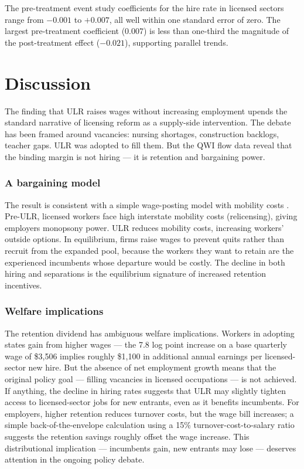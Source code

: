 \documentclass[12pt]{article}
\begin{document}
The pre-treatment event study coefficients for the hire rate in licensed sectors range from $-0.001$ to $+0.007$, all well within one standard error of zero. The largest pre-treatment coefficient (0.007) is less than one-third the magnitude of the post-treatment effect ($-0.021$), supporting parallel trends.


\section{Discussion}
\label{sec:discussion}

The finding that ULR raises wages without increasing employment upends the standard narrative of licensing reform as a supply-side intervention. The debate has been framed around vacancies: nursing shortages, construction backlogs, teacher gaps. ULR was adopted to fill them. But the QWI flow data reveal that the binding margin is not hiring --- it is retention and bargaining power.

\subsubsection*{A bargaining model} The result is consistent with a simple wage-posting model with mobility costs \citep{ManningBook2003}. Pre-ULR, licensed workers face high interstate mobility costs (relicensing), giving employers monopsony power. ULR reduces mobility costs, increasing workers' outside options. In equilibrium, firms raise wages to prevent quits rather than recruit from the expanded pool, because the workers they want to retain are the experienced incumbents whose departure would be costly. The decline in both hiring and separations is the equilibrium signature of increased retention incentives.

\subsubsection*{Welfare implications} The retention dividend has ambiguous welfare implications. Workers in adopting states gain from higher wages --- the 7.8 log point increase on a base quarterly wage of \$3,506 implies roughly \$1,100 in additional annual earnings per licensed-sector new hire. But the absence of net employment growth means that the original policy goal --- filling vacancies in licensed occupations --- is not achieved. If anything, the decline in hiring rates suggests that ULR may slightly tighten access to licensed-sector jobs for new entrants, even as it benefits incumbents. For employers, higher retention reduces turnover costs, but the wage bill increases; a simple back-of-the-envelope calculation using a 15\% turnover-cost-to-salary ratio suggests the retention savings roughly offset the wage increase. This distributional implication --- incumbents gain, new entrants may lose --- deserves attention in the ongoing policy debate.
\end{document}
